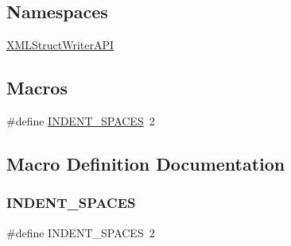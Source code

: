 \subsection*{Namespaces}
\begin{DoxyCompactItemize}
\item 
 \mbox{\hyperlink{namespaceXMLStructWriterAPI}{X\+M\+L\+Struct\+Writer\+A\+PI}}
\end{DoxyCompactItemize}
\subsection*{Macros}
\begin{DoxyCompactItemize}
\item 
\#define \mbox{\hyperlink{adat-devel_2other__libs_2xpath__reader_2include_2xml__struct__writer_8h_ad3b6821be9e4586b39163dad279459c4}{I\+N\+D\+E\+N\+T\+\_\+\+S\+P\+A\+C\+ES}}~2
\end{DoxyCompactItemize}


\subsection{Macro Definition Documentation}
\mbox{\label{adat-devel_2other__libs_2xpath__reader_2include_2xml__struct__writer_8h_ad3b6821be9e4586b39163dad279459c4}} 
\subsubsection{\texorpdfstring{INDENT\_SPACES}{INDENT\_SPACES}}
{\footnotesize\ttfamily \#define I\+N\+D\+E\+N\+T\+\_\+\+S\+P\+A\+C\+ES~2}

